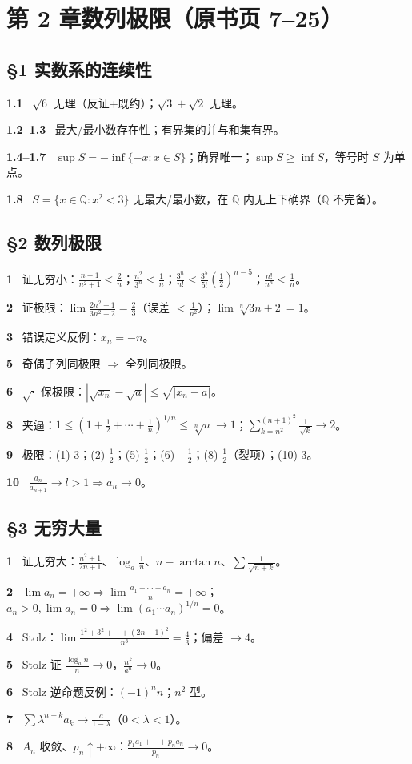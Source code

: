 \documentclass[11pt,a4paper,UTF8]{ctexart}
\newcommand{\qitem}[1]{\par\smallskip\noindent\textbf{#1}\ }
\begin{document}
\section{第 2 章\quad 数列极限（原书页 7--25）}
\subsection*{§1 实数系的连续性}
\qitem{1.1} $\sqrt6$ 无理（反证+既约）；$\sqrt3+\sqrt2$ 无理。\\
\qitem{1.2--1.3} 最大/最小数存在性；有界集的并与和集有界。\\
\qitem{1.4--1.7} $\sup S=-\inf\{-x:x\in S\}$；确界唯一；$\sup S\ge\inf S$，等号时 $S$ 为单点。\\
\qitem{1.8} $S=\{x\in\mathbb Q:x^2<3\}$ 无最大/最小数，在 $\mathbb Q$ 内无上下确界（$\mathbb Q$ 不完备）。

\subsection*{§2 数列极限}
\qitem{1} 证无穷小：$\frac{n+1}{n^2+1}<\frac2n$；$\frac{n^2}{3^n}<\frac1n$；$\frac{3^n}{n!}<\frac{3^5}{5!}(\frac12)^{n-5}$；$\frac{n!}{n^n}<\frac1n$。\\
\qitem{2} 证极限：$\lim\frac{2n^2-1}{3n^2+2}=\frac23$（误差 $<\frac1{n^2}$）；$\lim\sqrt[n]{3n+2}=1$。\\
\qitem{3} 错误定义反例：$x_n=-n$。\\
\qitem{5} 奇偶子列同极限 $\Rightarrow$ 全列同极限。\\
\qitem{6} $\sqrt{\cdot}$ 保极限：$|\sqrt{x_n}-\sqrt a|\le\sqrt{|x_n-a|}$。\\
\qitem{8} 夹逼：$1\le(1+\frac12+\cdots+\frac1n)^{1/n}\le\sqrt[n]n\to1$；$\sum_{k=n^2}^{(n+1)^2}\frac1{\sqrt k}\to2$。\\
\qitem{9} 极限：(1) 3；(2) $\frac12$；(5) $\frac12$；(6) $-\frac12$；(8) $\frac12$（裂项）；(10) 3。\\
\qitem{10} $\frac{a_n}{a_{n+1}}\to l>1\Rightarrow a_n\to0$。

\subsection*{§3 无穷大量}
\qitem{1} 证无穷大：$\frac{n^2+1}{2n+1}$、$\log_a\frac1n$、$n-\arctan n$、$\sum\frac1{\sqrt{n+k}}$。\\
\qitem{2} $\lim a_n=+\infty\Rightarrow\lim\frac{a_1+\cdots+a_n}n=+\infty$；$a_n>0,\lim a_n=0\Rightarrow\lim(a_1\cdots a_n)^{1/n}=0$。\\
\qitem{4} Stolz：$\lim\frac{1^2+3^2+\cdots+(2n+1)^2}{n^3}=\frac43$；偏差 $\to4$。\\
\qitem{5} Stolz 证 $\frac{\log_a n}{n}\to0$，$\frac{n^k}{a^n}\to0$。\\
\qitem{6} Stolz 逆命题反例：$(-1)^nn$；$n^2$ 型。\\
\qitem{7} $\sum\lambda^{n-k}a_k\to\frac a{1-\lambda}$（$0<\lambda<1$）。\\
\qitem{8} $A_n$ 收敛、$p_n\uparrow+\infty$：$\frac{p_1a_1+\cdots+p_na_n}{p_n}\to0$。
\end{document}
